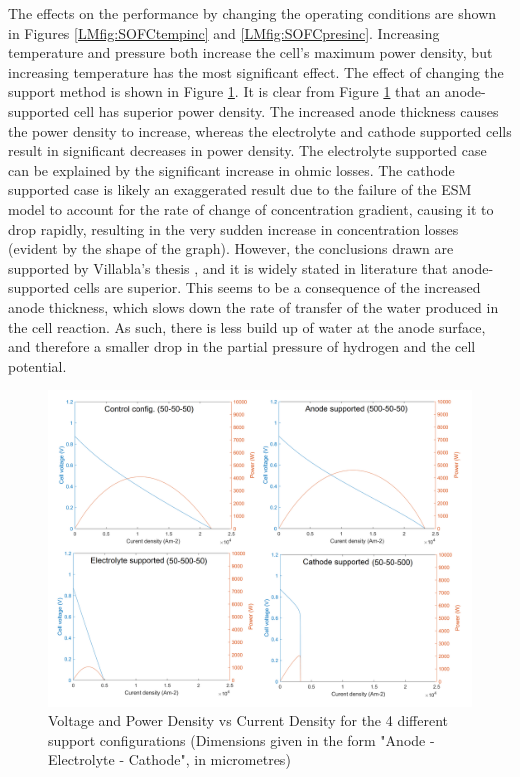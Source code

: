     The effects on the performance by changing the operating conditions are shown in Figures \ref{LMfig:SOFCtempinc} and \ref{LMfig:SOFCpresinc}. Increasing temperature and pressure both increase the cell's maximum power density, but increasing temperature has the most significant effect.
    The effect of changing the support method is shown in Figure \ref{LMfig:SOFCsupport}.
        It is clear from Figure \ref{LMfig:SOFCsupport} that an anode-supported cell has superior power density. The increased anode thickness causes the power density to increase, whereas the electrolyte and cathode supported cells result in significant decreases in power density. The electrolyte supported case can be explained by the significant increase in ohmic losses. The cathode supported case is likely an exaggerated result due to the failure of the ESM model to account for the rate of change of concentration gradient, causing it to drop rapidly, resulting in the very sudden increase in concentration losses (evident by the shape of the graph). However, the conclusions drawn are supported by Villabla's thesis \cite{LM2}, and it is widely stated in literature that anode-supported cells are superior. This seems to be a consequence of the increased anode thickness, which slows down the rate of transfer of the water produced in the cell reaction. As such, there is less build up of water at the anode surface, and therefore a smaller drop in the partial pressure of hydrogen and the cell potential.
    \\
  
  \begin{figure}[h]
      \centering
      \includegraphics[scale=0.6]{support_comparison.png}
      \caption{Voltage and Power Density vs Current Density for the 4 different support configurations (Dimensions given in the form "Anode - Electrolyte - Cathode", in micrometres)}
      \label{LMfig:SOFCsupport}
  \end{figure}

